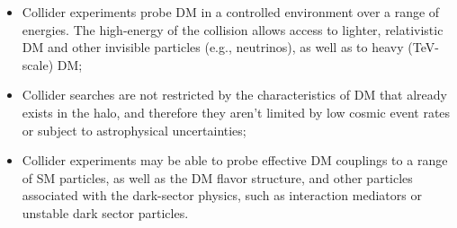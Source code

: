 \documentclass[nofootinbib]{article}
\begin{document}


\vspace{1em}
\begin{itemize}
\item Collider experiments probe DM in a controlled environment over a range of energies. The high-energy of the collision allows access to lighter, relativistic DM and other invisible particles (e.g., neutrinos), as well as to heavy (TeV-scale) DM; 
\item Collider searches are not restricted by the characteristics of DM that already exists in the halo, and therefore they aren't limited by low cosmic event rates or subject to astrophysical uncertainties; 
\item Collider experiments may be able to probe effective DM couplings to a range of SM particles, as well as the DM flavor structure, and other particles associated with the dark-sector physics, such as interaction mediators or unstable dark sector particles. 
\end{itemize}
\end{document}
